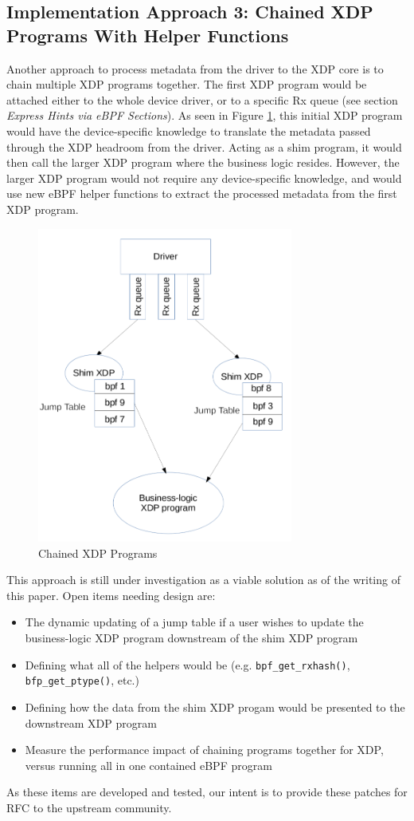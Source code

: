\documentclass[letterpaper]{article}
\begin{document}
\subsection{Implementation Approach 3: Chained XDP Programs With Helper Functions}

Another approach to process metadata from the driver to the XDP core is to chain multiple XDP programs together. The first XDP program would be attached either to the whole device driver, or to a specific Rx queue (see section \textit{Express Hints via eBPF Sections}). As seen in Figure \ref{xdp-chained-programs}, this initial XDP program would have the device-specific knowledge to translate the metadata passed through the XDP headroom from the driver. Acting as a shim program, it would then call the larger XDP program where the business logic resides. However, the larger XDP program would not require any device-specific knowledge, and would use new eBPF helper functions to extract the processed metadata from the first XDP program.

\begin{figure}[h]
\includegraphics[width=3.31in]{xdp-chained-programs.png}
\caption{Chained XDP Programs}
\label{xdp-chained-programs}
\end{figure}

\indent This approach is still under investigation as a viable solution as of the writing of this paper. Open items needing design are:
\begin{itemize}
\item The dynamic updating of a jump table if a user wishes to update the business-logic XDP program downstream of the shim XDP program
\item Defining what all of the helpers would be (e.g. {\small \texttt{bpf\_get\_rxhash()}}, {\small \texttt{bfp\_get\_ptype()}}, etc.)
\item Defining how the data from the shim XDP progam would be presented to the downstream XDP program
\item Measure the performance impact of chaining programs together for XDP, versus running all in one contained eBPF program
\end{itemize}
As these items are developed and tested, our intent is to provide these patches for RFC to the upstream community.
\end{document}
